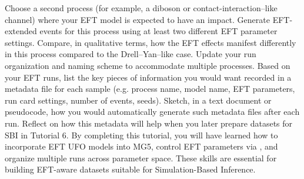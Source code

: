 {}\markdownRendererOlBeginTight
{}Choose a second process (for example, a diboson or contact-interaction–like channel) where your EFT model is expected to have an impact.\markdownRendererOlItemEnd 
{}Generate EFT-extended events for this process using at least two different EFT parameter settings.\markdownRendererOlItemEnd 
{}Compare, in qualitative terms, how the EFT effects manifest differently in this process compared to the Drell–Yan–like case.\markdownRendererOlItemEnd 
{}Update your run organization and naming scheme to accommodate multiple processes.\markdownRendererOlItemEnd 
\markdownRendererOlEndTight \markdownRendererInterblockSeparator
{}
\markdownRendererSectionEnd \markdownRendererSectionBegin
{}\markdownRendererInterblockSeparator
{}\markdownRendererOlBeginTight
{}Based on your EFT runs, list the key pieces of information you would want recorded in a metadata file for each sample (e.g. process name, model name, EFT parameters, run card settings, number of events, seeds).\markdownRendererOlItemEnd 
{}Sketch, in a text document or pseudocode, how you would automatically generate such metadata files after each run.\markdownRendererOlItemEnd 
{}Reflect on how this metadata will help when you later prepare datasets for SBI in Tutorial 6.\markdownRendererOlItemEnd 
\markdownRendererOlEndTight \markdownRendererInterblockSeparator
{}\markdownRendererThematicBreak{}\markdownRendererInterblockSeparator
{}By completing this tutorial, you will have learned how to incorporate EFT UFO models into MG5, control EFT parameters via , and organize multiple runs across parameter space. These skills are essential for building EFT-aware datasets suitable for Simulation-Based Inference.
\markdownRendererSectionEnd 
\markdownRendererSectionEnd 
\markdownRendererSectionEnd \markdownRendererDocumentEnd